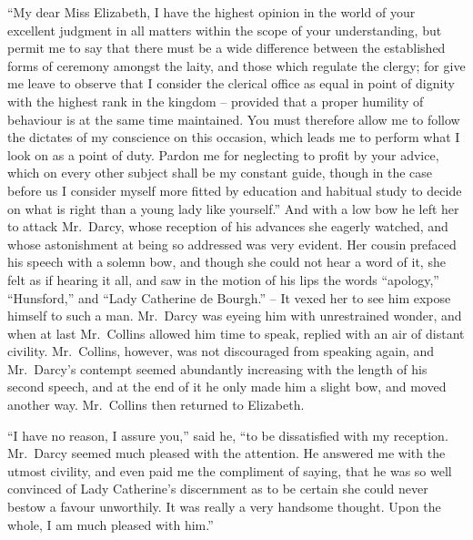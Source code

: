 “My dear Miss Elizabeth, I have the highest opinion
in the world of your excellent judgment in all matters
within the scope of your understanding, but permit me
to say that there must be a wide difference between the
established forms of ceremony amongst the laity, and those
which regulate the clergy; for give me leave to observe
that I consider the clerical office as equal in point of
dignity with the highest rank in the kingdom -- provided
that a proper humility of behaviour is at the same time
maintained. You must therefore allow me to follow the
dictates of my conscience on this occasion, which leads
me to perform what I look on as a point of duty. Pardon
me for neglecting to profit by your advice, which on every
other subject shall be my constant guide, though in the
case before us I consider myself more fitted by education
and habitual study to decide on what is right than a young
lady like yourself.” And with a low bow he left her to
attack Mr.\ Darcy, whose reception of his advances she
eagerly watched, and whose astonishment at being so
addressed was very evident. Her cousin prefaced his
speech with a solemn bow, and though she could not hear
a word of it, she felt as if hearing it all, and saw in the
motion of his lips the words “apology,” “Hunsford,” and
“Lady Catherine de Bourgh.” -- It vexed her to see him
expose himself to such a man. Mr.\ Darcy was eyeing him
with unrestrained wonder, and when at last Mr.\ Collins
allowed him time to speak, replied with an air of distant
civility. Mr.\ Collins, however, was not discouraged from
speaking again, and Mr.\ Darcy’s contempt seemed abundantly
increasing with the length of his second speech,
and at the end of it he only made him a slight bow,
and moved another way. Mr.\ Collins then returned to
Elizabeth.

“I have no reason, I assure you,” said he, “to be
dissatisfied with my reception. Mr.\ Darcy seemed much
pleased with the attention. He answered me with the
utmost civility, and even paid me the compliment of
saying, that he was so well convinced of Lady Catherine’s
discernment as to be certain she could never bestow
a favour unworthily. It was really a very handsome
thought. Upon the whole, I am much pleased with him.”

